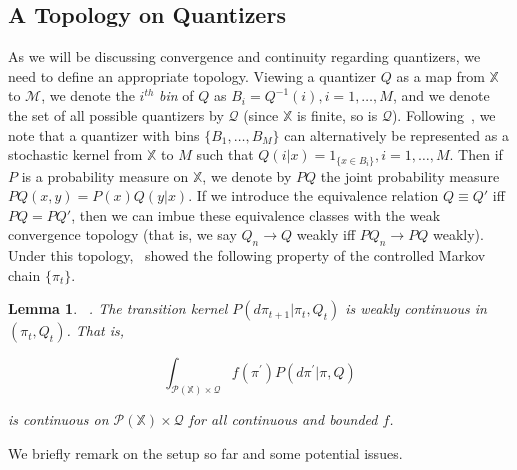 \documentclass{article}
\newtheorem{lemma}[theorem]{Lemma}
\begin{document}
\subsection{A Topology on Quantizers}
As we will be discussing convergence and continuity regarding quantizers, we need to define an appropriate topology. Viewing a quantizer \( Q \) as a map from \( \mathbb{X} \) to \( \mathcal{M} \), we denote the \( i^{th} \) \emph{bin} of \( Q \) as \( B_i = Q^{-1}(i), i=1,\ldots,M \), and we denote the set of all possible quantizers by \( \mathcal{Q} \) (since \(\mathbb{X}\) is finite, so is \(\mathcal{Q}\)). Following~\cite{Linder}, we note that a quantizer with bins \( \{B_1,\ldots,B_M\} \) can alternatively be represented as a stochastic kernel from \( \mathbb{X} \) to \( M \) such that \( Q(i|x) = 1_{\{x \in B_i\}}, i=1,\ldots,M \). Then if \( P \) is a probability measure on \( \mathbb{X} \), we denote by \( PQ \) the joint probability measure \( PQ(x,y) = P(x)Q(y|x) \). If we introduce the equivalence relation \( Q \equiv Q' \) iff \( PQ = PQ' \), then we can imbue these equivalence classes with the weak convergence topology (that is, we say \( Q_n \to Q \) weakly iff \( PQ_n \to PQ \) weakly). Under this topology,~\cite{Linder} showed the following property of the controlled Markov chain \( \{\pi_t\} \).

\begin{lemma}\label{lemma:weak}~\cite[Lemma 11]{Linder}.
    The transition kernel \( P(d\pi_{t+1}|\pi_t,Q_t) \) is weakly continuous in \( (\pi_t,Q_t) \). That is,

    \[ \int_{\mathcal{P}(\mathbb{X}) \times \mathcal{Q}} f(\pi^{'})P(d \pi^{'}|\pi, Q) \]

    is continuous on \( \mathcal{P}(\mathbb{X}) \times \mathcal{Q} \) for all continuous and bounded \(f\).
\end{lemma}

\noindent We briefly remark on the setup so far and some potential issues.
\end{document}
